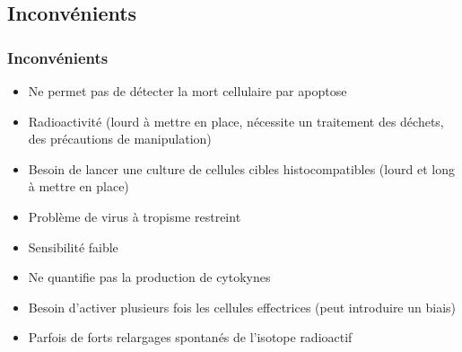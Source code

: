\documentclass[12pt]{beamer}
\begin{document}

\subsection{Inconvénients}

\begin{frame}
  \transuncover
  \frametitle{Inconvénients}

  \begin{itemize}
  \item Ne permet pas de détecter la mort cellulaire par apoptose
  \item Radioactivité (lourd à mettre en place, nécessite un traitement des déchets, des précautions de manipulation)
  \item Besoin de lancer une culture de cellules cibles histocompatibles (lourd et long à mettre en place)
  \item Problème de virus à tropisme restreint
  \item Sensibilité faible
  \item Ne quantifie pas la production de cytokynes
  \item Besoin d'activer plusieurs fois les cellules effectrices (peut introduire un biais)
  \item Parfois de forts relargages spontanés de l'isotope radioactif
  \end{itemize}
\end{frame}
\end{document}
